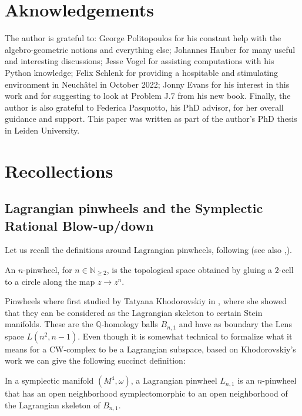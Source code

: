 \section*{Aknowledgements}
The author is grateful to: George Politopoulos for his constant help with the algebro-geometric notions and everything else; Johannes Hauber for many useful and interesting discussions; Jesse Vogel for assisting computations with his Python knowledge; Felix Schlenk for providing a hospitable and stimulating environment in Neuch\^{a}tel in October 2022; Jonny Evans for his interest in this work and for suggesting to look at Problem J.$7$ from his new book. Finally, the author is also grateful to Federica Pasquotto, his PhD advisor, for her overall guidance and support. This paper was written as part of the author's PhD thesis in Leiden University.






\section{Recollections}


\subsection{Lagrangian pinwheels and the Symplectic Rational Blow-up/down}\label{ratblowupsec}
Let us recall the definitions around Lagrangian pinwheels, following \cite{BS}(see also \cite{khodorovskiy2013symplectic},\cite{ES}). 

\begin{defi}
An $n$-pinwheel, for $n\in \mathbb{N}_{\geq 2}$, is the topological space obtained by gluing a $2$-cell to a circle along the map $z\rightarrow z^{n}$.
\end{defi} 

Pinwheels where first studied by Tatyana Khodorovskiy in \cite{khodorovskiy2013symplectic}, where she showed that they can be considered as the Lagrangian skeleton to certain Stein manifolds. These are the $\mathbb{Q}$-homology balls $B_{n,1}$ and have as boundary the Lens space $L(n^2,n-1)$. Even though it is somewhat technical to formalize what it means for a CW-complex to be a Lagrangian subspace, based on Khodorovskiy's work we can give the following succinct definition:

\begin{defi}
In a symplectic manifold $(M^4,\omega)$, a Lagrangian pinwheel $L_{n,1}$ is an $n$-pinwheel that has an open neighborhood symplectomorphic to an open neighborhood of the Lagrangian skeleton of $B_{n,1}$.
\end{defi}

